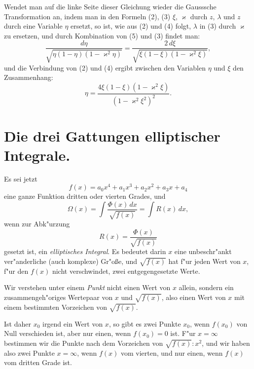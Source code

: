 \documentclass[12pt,a4paper]{article}
\theoremstyle{definition}
\begin{document}
\newpage

Wendet man auf die linke Seite dieser Gleichung wieder die Gausssche Transformation an, indem man in den Formeln (2), (3) $\xi$, $\varkappa$ durch $z$, $\lambda$ und $z$ durch eine Variable $\eta$ ersetzt, so ist, wie aus (2) und (4) folgt, $\lambda$ in (3) durch $\varkappa$ zu ersetzen, und durch Kombination von (5) und (3) findet man:
\begin{equation}\tag{6}
\frac{d\eta}{\sqrt{\eta(1-\eta)(1-\varkappa^2\eta)}} = \frac{2\,d\xi}{\sqrt{\xi(1-\xi)(1-\varkappa^2\xi)}},
\end{equation}
und die Verbindung von (2) und (4) ergibt zwischen den Variablen $\eta$ und $\xi$ den Zusammenhang:
\begin{equation}\tag{7}
\eta = \frac{4\xi(1-\xi)(1-\varkappa^2\xi)}{(1-\varkappa^2\xi^2)^2}.
\end{equation}

\section{Die drei Gattungen elliptischer Integrale.}

Es sei jetzt
\begin{equation}\tag{1}
f(x) = a_0x^4 + a_1x^3 + a_2x^2 + a_3x + a_4
\end{equation}
eine ganze Funktion dritten oder vierten Grades, und
\begin{equation}\tag{2}
\Omega(x) = \int\frac{\Phi(x)\,dx}{\sqrt{f(x)}} = \int R(x)\,dx,
\end{equation}
wenn zur Abk"urzung
\begin{equation}\tag{3}
R(x) = \frac{\Phi(x)}{\sqrt{f(x)}}
\end{equation}
gesetzt ist, ein \emph{elliptisches Integral}. Es bedeutet darin $x$ eine unbeschr"ankt ver"anderliche (auch komplexe) Gr"o\ss{}e, und $\sqrt{f(x)}$ hat f"ur jeden Wert von $x$, f"ur den $f(x)$ nicht verschwindet, zwei entgegengesetzte Werte.

Wir verstehen unter einem \emph{Punkt} nicht einen Wert von $x$ allein, sondern ein zusammengeh"origes Wertepaar von $x$ und $\sqrt{f(x)}$, also einen Wert von $x$ mit einem bestimmten Vorzeichen von $\sqrt{f(x)}$.

\newpage

Ist daher $x_0$ irgend ein Wert von $x$, so gibt es zwei Punkte $x_0$, wenn $f(x_0)$ von Null verschieden ist, aber nur einen, wenn $f(x_0) = 0$ ist. F"ur $x = \infty$ bestimmen wir die Punkte nach dem Vorzeichen von $\sqrt{f(x)}:x^2$, und wir haben also zwei Punkte $x = \infty$, wenn $f(x)$ vom vierten, und nur einen, wenn $f(x)$ vom dritten Grade ist.
\end{document}
